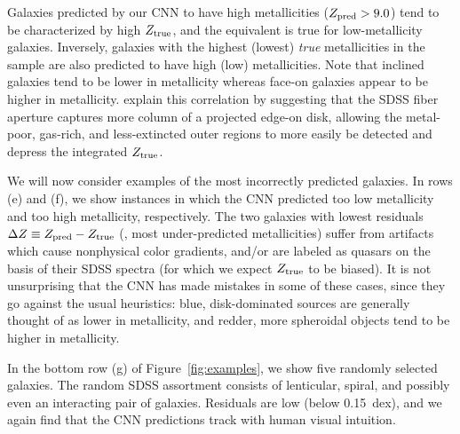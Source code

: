 \documentclass[fleqn,usenatbib]{mnras}
\begin{document}
Galaxies predicted by our CNN to have high metallicities ($Z_{\rm pred} > 9.0$) tend to be characterized by high $Z_{\rm true}$, and the equivalent is true for low-metallicity galaxies. Inversely, galaxies with the highest (lowest) \textit{true} metallicities in the sample are also predicted to have high (low) metallicities. Note that inclined galaxies tend to be lower in metallicity whereas face-on galaxies appear to be higher in metallicity. \cite{Tremonti2004} explain this correlation by suggesting that the SDSS fiber aperture captures more column of a projected edge-on disk, allowing the metal-poor, gas-rich, and less-extincted outer regions to more easily be detected and depress the integrated $Z_{\rm true}$.

We will now consider examples of the most incorrectly predicted galaxies. In rows (e) and (f), we show instances in which the CNN predicted too low metallicity and too high metallicity, respectively. The two galaxies with lowest residuals $\Delta Z \equiv Z_{\rm pred} - Z_{\rm true}$ (\ie, most under-predicted metallicities) suffer from artifacts which cause nonphysical color gradients, and/or are labeled as quasars on the basis of their SDSS spectra (for which we expect $Z_{\rm true}$ to be biased). It is not unsurprising that the CNN has made mistakes in some of these cases, since they go against the usual heuristics: blue, disk-dominated sources are generally thought of as lower in metallicity, and redder, more spheroidal objects tend to be higher in metallicity.

In the bottom row (g) of Figure~\ref{fig:examples}, we show five randomly selected galaxies. The random SDSS assortment consists of lenticular, spiral, and possibly even an interacting pair of galaxies. Residuals are low (below 0.15~dex), and we again find that the CNN predictions track with human visual intuition.
\end{document}
